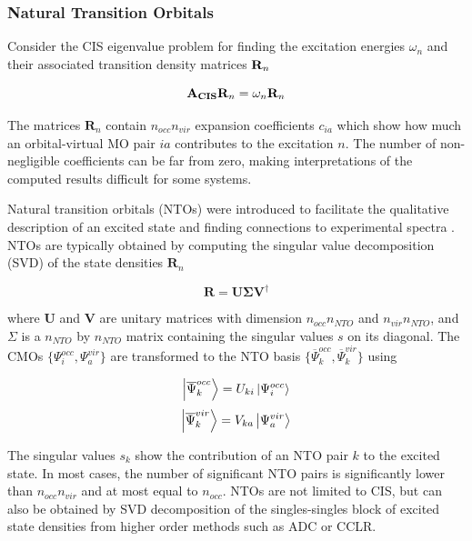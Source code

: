 \subsubsection{Natural Transition Orbitals}

Consider the CIS eigenvalue problem for finding the excitation energies $\omega_n$ and their associated transition density matrices $\mathbf{R}_n$

\begin{equation}
\mathbf{A_{CIS}} \mathbf{R}_n = \omega_n \mathbf{R}_n 
\end{equation}

\noindent The matrices $\mathbf{R}_n$ contain $n_{occ}n_{vir}$ expansion coefficients $c_{ia}$ which show how much an orbital-virtual MO pair $ia$ contributes to the excitation $n$. The number of non-negligible coefficients can be far from zero, making interpretations of the computed results difficult for some systems.

Natural transition orbitals (NTOs) were introduced to facilitate the qualitative description of an excited state and finding connections to experimental spectra \cite{Luz1976, Mar2003}. NTOs are typically obtained by computing the singular value decomposition (SVD) of the state densities $\mathbf{R}_n$

\begin{equation}
\mathbf{R} = \mathbf{U} \mathbf{\Sigma} \mathbf{V}^{\dagger}  
\end{equation} 

\noindent where $\mathbf{U}$ and $\mathbf{V}$ are unitary matrices with dimension $n_{occ} n_{NTO}$ and $n_{vir}n_{NTO}$, and $\Sigma$ is a $n_{NTO}$ by $n_{NTO}$ matrix containing the singular values $s$ on its diagonal. The CMOs $\{\Psi^{occ}_i,\Psi^{vir}_a\}$ are transformed to the NTO basis $\{\overline{\Psi}^{occ}_k,\overline{\Psi}^{vir}_k\}$ using

\begin{equation}
\ket{\overline{\Psi}^{occ}_k} = U_{ki} \ket{\Psi^{occ}_i}
\end{equation}
\begin{equation}
\ket{\overline{\Psi}^{vir}_k} = V_{ka} \ket{\Psi^{vir}_a}
\end{equation}

\noindent The singular values $s_k$ show the contribution of an NTO pair $k$ to the excited state. In most cases, the number of significant NTO pairs is significantly lower than $n_{occ}n_{vir}$ and at most equal to $n_{occ}$. NTOs are not limited to CIS, but can also be obtained by SVD decomposition of the singles-singles block of excited state densities from higher order methods such as ADC or CCLR. 

